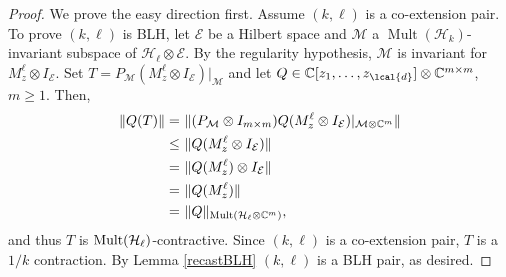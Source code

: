 \documentclass[a4paper,reqno,index]{amsart}
\numberwithin{equation}{section}
\newcommand{\Mult}{\operatorname{Mult}}
\newcommand{\cM}{\mathcal{M}}
\newcommand{\cH}{\mathcal{H}}
\newcommand{\HSE}{\mathcal{E}}
\theoremstyle{definition}
\begin{document}
\begin{proof}
We prove the easy direction first. Assume $(k, \ell)$ is a co-extension pair. To prove $(k,\ell)$ is BLH, let $\mathcal{E}$ be a Hilbert space and $\mathcal{M}$ a $ \Mult(\cH_k)$-invariant subspace of $\mathcal{H}_{\ell}\otimes {\mathcal{E}}$. By the regularity hypothesis,
$\cM$ is invariant for $M_z^\ell \otimes I_\HSE.$  Set $T=P_{\mathcal{M}}(M^{\ell}_z\otimes I_{\mathcal{E}})|_{\mathcal{M}}$ and let $Q\in\mathbb{C}[z_1, \dots, z_{\lcal{d}}]\otimes\mathbb{C}^{m\times m}$,  $m\ge 1.$ Then,
\begin{align*}
\|Q(T)\|=&\ \|(P_{\mathcal{M}}\otimes I_{m\times m})Q(M^{\ell}_z\otimes I_{\mathcal{E}})|_{\mathcal{M}\otimes \mathbb{C}^m}\| \\
\le& \ \|Q(M^{\ell}_z\otimes I_{\mathcal{E}})\|\\
=&\ \|Q(M^{\ell}_z)\otimes I_{\mathcal{E}}\| \\
=&\ \|Q(M^{\ell}_z)\| \\
=&\ \|Q\|_{\textup{Mult}(\mathcal{H}_{\ell}\otimes\mathbb{C}^m)},
\end{align*}
and thus $T$ is  $\textup{Mult}(\mathcal{H}_{\ell})$-contractive. Since $(k, \ell)$ is a co-extension pair, $T$ is a $1/k$ contraction. By Lemma \ref{recastBLH} $(k, \ell)$ is a BLH pair, as desired. 

\par 
 

\end{proof}
\end{document}
